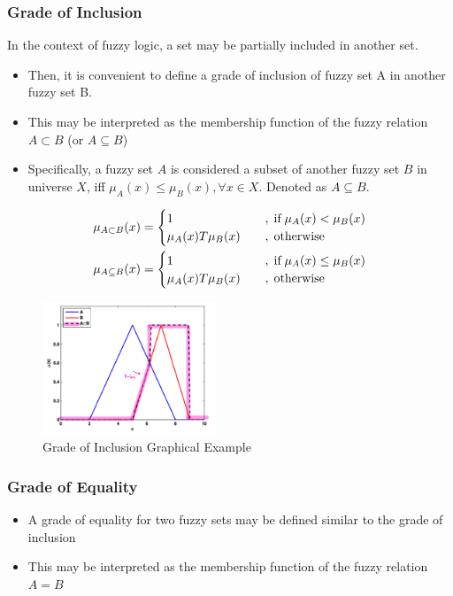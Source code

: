 \documentclass{tron}
\begin{document}
\subsubsection{Grade of Inclusion}
In the context of fuzzy logic, a set may be partially included in another set.
\begin{itemize}
	\item Then, it is convenient to define a grade of inclusion of fuzzy set A in another fuzzy set B.
	\item This may be interpreted as the membership function of the fuzzy relation $A\subset B$ (or $A\subseteq B$)
	\item Specifically, a fuzzy set $A$ is considered a subset of another fuzzy set $B$ in universe $X$, iff $\mu_A(x) \leq \mu_B(x), \forall x\in X$. Denoted as $A\subseteq B$.
\end{itemize}

\begin{align}
	\mu_{A\subset B}(x) &= \begin{cases}
		1 \quad & ,\;\text{if}\; \mu_A(x) < \mu_B(x) \\
		\mu_A(x)T\mu_B(x) \quad & ,\;\text{otherwise}  
	\end{cases} \\
	\mu_{A\subseteq B}(x) &= \begin{cases}
		1 \quad & ,\;\text{if}\; \mu_A(x) \leq \mu_B(x) \\
		\mu_A(x)T\mu_B(x) \quad & ,\;\text{otherwise}  
	\end{cases}
\end{align}

\begin{figure}[H]
	\centering
	\includegraphics[height=150px]{Figs/Fuzzy/op-inclusion}
	\caption{Grade of Inclusion Graphical Example}
	\label{fig:fuzzy:inclusion:ex}
\end{figure}


\subsubsection{Grade of Equality}
\begin{itemize}
	\item A grade of equality for two fuzzy sets may be defined similar to the grade of inclusion
	\item This may be interpreted as the membership function of the fuzzy relation $A=B$
\end{itemize}
\end{document}
